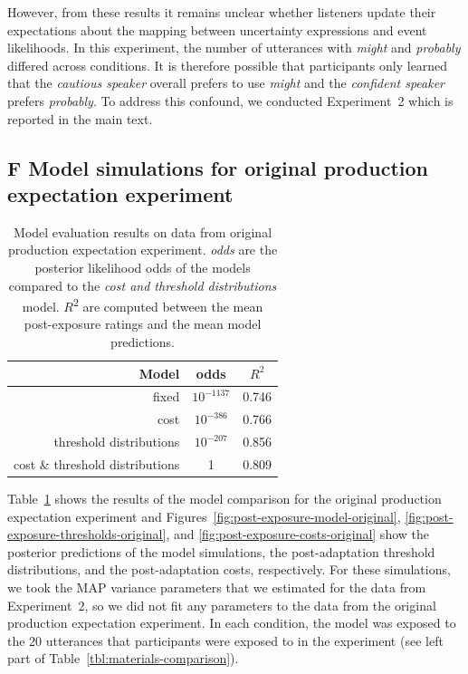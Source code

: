 \documentclass[man, floatsintext]{apa6}
\begin{document}
However, from these results it remains unclear whether listeners update their expectations about the mapping between uncertainty expressions and event likelihoods. In this experiment, the number of utterances with \textit{might} and \textit{probably} differed across conditions. It is therefore possible that participants only learned that the {\it cautious speaker} overall prefers to use {\it might} and the {\it confident speaker} prefers {\it probably}. To address this confound, we conducted Experiment~2 which is reported in the main text.

\subsection*{F Model simulations for original production expectation experiment}

\begin{table}
\center
\begin{tabular}{r | c | c }
Model &   odds  &  $R^2$ \\ \midrule
fixed & $10^{-1137}$ &  0.746       \\
cost & $10^{-386}$ & 0.766     \\
threshold distributions & $10^{-207}$ &  0.856 \\
cost \& threshold distributions & 1 &  0.809 \\
\end{tabular}
\caption{Model evaluation results on data from original production expectation experiment.   \textit{odds} are the posterior likelihood odds of the models compared to the \textit{cost and threshold distributions} model.  $R$\textsuperscript{$2$} are computed between  the mean post-exposure ratings and the mean model predictions. \label{tbl:model-comparison-orig}}
\end{table}


Table~\ref{tbl:model-comparison-orig} shows the results of the model comparison  for the original production expectation experiment and  Figures~\ref{fig:post-exposure-model-original}, \ref{fig:post-exposure-thresholds-original}, and \ref{fig:post-exposure-costs-original} show the posterior predictions
of the model simulations, the post-adaptation threshold distributions, and the post-adaptation costs, respectively. For these simulations, we took the MAP variance parameters that we estimated for the data from Experiment~2, so we did not fit any parameters to the data from the original production expectation experiment. In each condition, the model was exposed to the 20 utterances that participants were exposed to in the experiment (see left part of Table~\ref{tbl:materials-comparison}).
\end{document}
